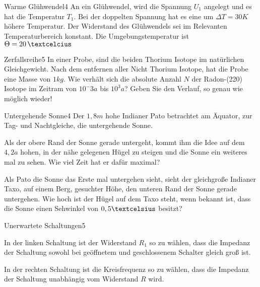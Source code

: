 



\begin{problem}{Warme Glühwendel}{4}
An ein Glühwendel, wird die Spannung $U_1$ angelegt und es hat die Temperatur $T_1$. Bei der doppelten Spannung hat es eine um $\Delta T=30\unit{K}$ höhere Temperatur. Der Widerstand des Glühwendels sei im Relevanten Temperaturbereich konstant. Die Umgebungstemperatur ist $\Theta=20\unit{\textcelcius}$
\end{problem}

\begin{problem}{Zerfallsreihe}{5}
In einer Probe, sind die beiden Thorium Isotope im natürlichen Gleichgewicht. Nach dem entfernen aller Nicht Thorium Isotope, hat die Probe eine Masse von $1kg$. Wie verhält sich die absolute Anzahl $N$ der Radon-(220) Isotope im Zeitram von $10^-3\unit{a}$ bis $10^3\unit{a}$? Geben Sie den Verlauf, so genau wie möglich wieder!
\end{problem}

\begin{problem}{Untergehende Sonne}{4}
Der $1,8\unit{m}$ hohe Indianer Pato betrachtet am Äquator, zur Tag- und Nachtgleiche, die untergehende Sonne.
 \begin{abcenum}
  \item Als der obere Rand der Sonne gerade untergeht, kommt ihm die Idee auf dem $4,2\unit{a}$ hohen, in der nähe gelegenen Hügel zu steigen und die Sonne ein weiteres mal zu sehen. Wie viel Zeit hat er dafür maximal?
  \item Als Pato die Sonne das Erste mal untergehen sieht, sieht der gleichgroße Indianer Taxo, auf einem Berg, gesuchter Höhe, den unteren Rand der Sonne gerade untergehen. Wie hoch ist der Hügel auf dem Taxo steht, wenn bekannt ist, dass die Sonne einen Sehwinkel von $0,5\textcelsius$ besitzt?
 \end{abcenum}
\end{problem}

\begin{problem}{Unerwartete Schaltungen}{5}
 \begin{abcenum}
  \item In der linken Schaltung ist der Widerstand $R_1$ so zu wählen, dass die Impedanz der Schaltung sowohl bei geöffnetem und geschlossenem Schalter gleich groß ist.
  \item In der rechten Schaltung ist die Kreisfrequenz so zu wählen, dass die Impedanz der Schaltung unabhängig vom Widerstand $R$ wird.
 \end{abcenum}
\end{problem}

